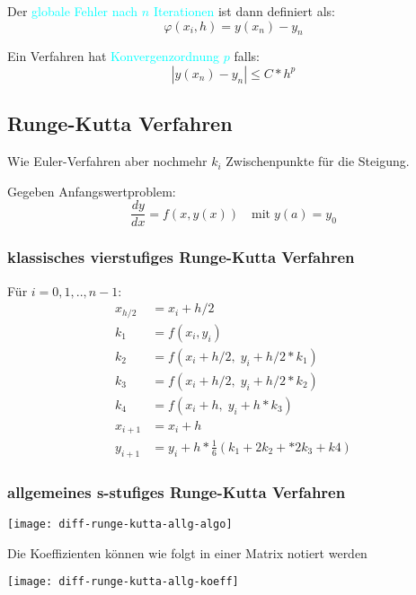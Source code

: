 Der \textcolor{cyan}{globale Fehler nach $n$ Iterationen} ist dann definiert als:
$$\varphi(x_i, h) = y(x_n) - y_n$$

Ein Verfahren hat \textcolor{cyan}{Konvergenzordnung $p$} falls:
$$|y(x_n) - y_n| \le C * h^p$$










\subsection{Runge-Kutta Verfahren}

Wie Euler-Verfahren aber nochmehr $k_i$ Zwischenpunkte für die Steigung.

Gegeben Anfangswertproblem:
$$\frac{dy}{dx} = f(x, y(x)) \quad \mathrm{mit} \; y(a) = y_0$$


\subsubsection{klassisches vierstufiges Runge-Kutta Verfahren}


\begingroup
\addtolength{\jot}{0.5em}
\large
Für $i = 0,1,..,n-1$:
\begin{align*}
	x_{h/2} & = x_i + h/2                                       \\
	k_1     & = f(x_i, y_i)                                     \\
	k_2     & = f(x_i + h/2, \; y_i + h/2 * k_1)                \\
	k_3     & = f(x_i + h/2, \; y_i + h/2 * k_2)                \\
	k_4     & = f(x_i + h, \; y_i + h * k_3)                    \\
	x_{i+1} & = x_i + h                                         \\
	y_{i+1} & = y_i + h * \frac{1}{6}(k_1 + 2k_2 + * 2k_3 + k4)
\end{align*}
\endgroup


\subsubsection{allgemeines s-stufiges Runge-Kutta Verfahren}


\texttt{[image: diff-runge-kutta-allg-algo]}

Die Koeffizienten können wie folgt in einer Matrix notiert werden

\begin{center}
	\texttt{[image: diff-runge-kutta-allg-koeff]}
\end{center}



